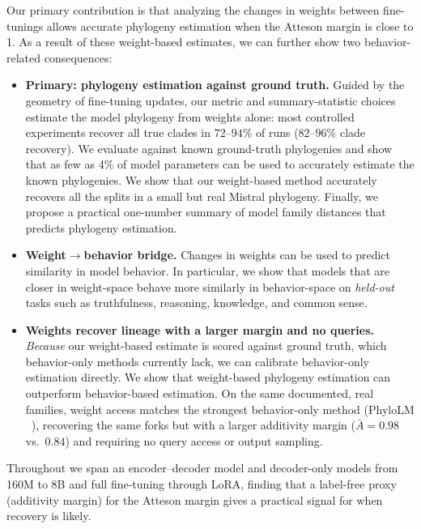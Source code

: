 \documentclass{article}
\theoremstyle{definition}
\theoremstyle{plain}
\begin{document}
Our primary contribution is that analyzing the changes in weights between fine-tunings allows accurate phylogeny estimation when the Atteson margin is close to 1.  As a result of these weight-based estimates, we can further show two behavior-related consequences:
\begin{itemize}[leftmargin=1.3em,itemsep=1pt,topsep=2pt,parsep=0pt]
  \item \textbf{Primary: phylogeny estimation against ground truth.} Guided by the geometry of
    fine-tuning updates, our metric and summary-statistic choices estimate the model phylogeny from
    weights alone: most controlled experiments recover all true clades in $72$--$94\%$ of runs
    ($82$--$96\%$ clade recovery). We evaluate against known ground-truth phylogenies and show that as few as 4\% of model parameters can be used to accurately estimate the known phylogenies.  We show that our weight-based method accurately recovers all the splits in a small but real Mistral phylogeny. Finally, we propose a practical one-number summary of model family distances that predicts phylogeny estimation.
  \item \textbf{Weight$\to$behavior bridge.} Changes in weights can be used to predict similarity in model behavior.  In particular, we show that models that are closer in weight-space behave more similarly in behavior-space on \textit{held-out} tasks such as truthfulness, reasoning, knowledge, and common sense.
  \item \textbf{Weights recover lineage with a larger margin and no queries.}
    \emph{Because} our weight-based estimate is scored against ground truth, which behavior-only
    methods currently lack, we can calibrate behavior-only estimation directly.  We show that weight-based phylogeny estimation can outperform behavior-based estimation. On the same documented, real
    families, weight access matches the strongest behavior-only method (PhyloLM ~\cite{yax2025phylolm}), recovering the same
    forks but with a larger additivity margin ($\bar{A}=0.98$ vs.\ $0.84$)
    and requiring no query access or output sampling.
\end{itemize}
Throughout we span an encoder--decoder model and decoder-only models from 160M to 8B and full
fine-tuning through LoRA, finding that a label-free proxy (additivity margin) for the Atteson margin gives a practical signal
for when recovery is likely.
\end{document}
